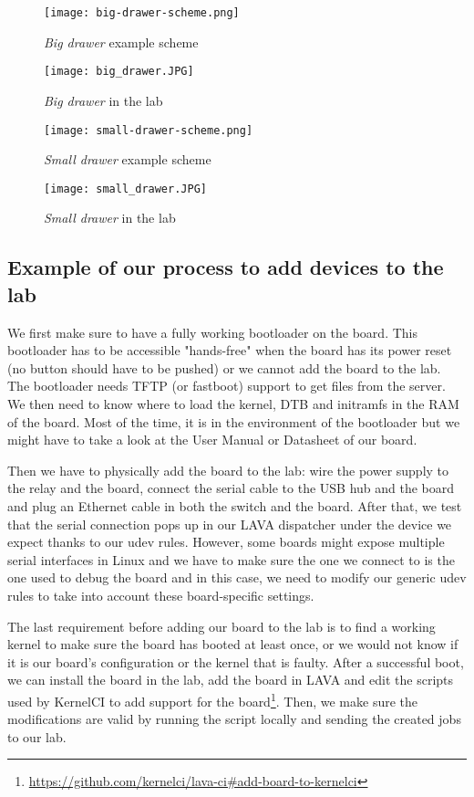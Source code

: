 \begin{figure}[H]
  \centering
  \texttt{[image: big-drawer-scheme.png]}
  \caption{\textit{Big drawer} example scheme}
\end{figure}
\begin{figure}[H]
  \texttt{[image: big\_drawer.JPG]}
  \caption{\textit{Big drawer} in the lab}
\end{figure}
\begin{figure}[H]
  \centering
  \texttt{[image: small-drawer-scheme.png]}
  \caption{\textit{Small drawer} example scheme}
\end{figure}
\begin{figure}[H]
  \texttt{[image: small\_drawer.JPG]}
  \caption{\textit{Small drawer} in the lab}
\end{figure}



\subsection{Example of our process to add devices to the lab}

We first make sure to have a fully working bootloader on the board. This bootloader has to be accessible "hands-free" when the board has its power reset (no button should have to be pushed) or we cannot add the board to the lab. The bootloader needs TFTP (or fastboot) support to get files from the server. We then need to know where to load the kernel, DTB and initramfs in the RAM of the board. Most of the time, it is in the environment of the bootloader but we might have to take a look at the User Manual or Datasheet of our board.

Then we have to physically add the board to the lab: wire the power supply to the relay and the board, connect the serial cable to the USB hub and the board and plug an Ethernet cable in both the switch and the board. After that, we test that the serial connection pops up in our LAVA dispatcher under the device we expect thanks to our udev rules. However, some boards might expose multiple serial interfaces in Linux and we have to make sure the one we connect to is the one used to debug the board and in this case, we need to modify our generic udev rules to take into account these board-specific settings.

The last requirement before adding our board to the lab is to find a working kernel to make sure the board has booted at least once, or we would not know if it is our board's configuration or the kernel that is faulty. After a successful boot, we can install the board in the lab, add the board in LAVA and edit the scripts used by KernelCI to add support for the board\footnote{\url{https://github.com/kernelci/lava-ci\#add-board-to-kernelci}}. Then, we make sure the modifications are valid by running the script locally and sending the created jobs to our lab.

